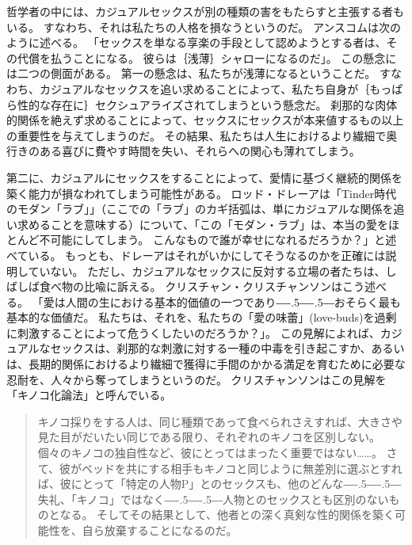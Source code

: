 \documentclass[paper=a4,book,openany]{jlreq}
\def\DDASH{―\kern-.5\zw―\kern-.5\zw―} %
\begin{document}
哲学者の中には、カジュアルセックスが別の種類の害をもたらすと主張する者もいる。
すなわち、それは私たちの人格を損なうというのだ。
アンスコムは次のように述べる。
「セックスを単なる享楽の手段として認めようとする者は、その代償を払うことになる。
彼らは｛浅薄｝{シャロー}になるのだ」\citep{anscombe72contraception}。
この懸念には二つの側面がある。
第一の懸念は、私たちが浅薄になるということだ。
すなわち、カジュアルなセックスを追い求めることによって、私たち自身が｛もっぱら性的な存在に｝{セクシュアライズ}されてしまうという懸念だ。
刹那的な肉体的関係を絶えず求めることによって、セックスにセックスが本来値するもの以上の重要性を与えてしまうのだ。
その結果、私たちは人生におけるより繊細で奥行きのある喜びに費やす時間を失い、それらへの関心も薄れてしまう。

第二に、カジュアルにセックスをすることによって、愛情に基づく継続的関係を築く能力が損なわれてしまう可能性がある。
ロッド・ドレーアは「Tinder時代のモダン「ラブ」」（ここでの「ラブ」のカギ括弧は、単にカジュアルな関係を追い求めることを意味する）について、「この「モダン・ラブ」は、本当の愛をほとんど不可能にしてしまう。
こんなもので誰が幸せになれるだろうか？」と述べている\citep{dreher15:_moder_love_age_tind}。
もっとも、ドレーアはそれがいかにしてそうなるのかを正確には説明していない。
ただし、カジュアルなセックスに反対する立場の者たちは、しばしば食べ物の比喩に訴える。
クリスチャン・クリスチャンソンはこう述べる。
「愛は人間の生における基本的価値の一つであり{\DDASH}おそらく最も基本的な価値だ。
私たちは、それを、私たちの「愛の味蕾」(love-buds)を過剰に刺激することによって危うくしたいのだろうか？」\citep[p.105]{krisjansson98:_casual_sex_revis}。
この見解によれば、カジュアルなセックスは、刹那的な刺激に対する一種の中毒を引き起こすか、あるいは、長期的関係におけるより繊細で獲得に手間のかかる満足を育むために必要な忍耐を、人々から奪ってしまうというのだ。
クリスチャンソンはこの見解を「キノコ化論法」と呼んでいる。

\begin{quote}
  キノコ採りをする人は、同じ種類であって食べられさえすれば、大きさや見た目がだいたい同じである限り、それぞれのキノコを区別しない。
個々のキノコの独自性など、彼にとってはまったく重要ではない……。
さて、彼がベッドを共にする相手もキノコと同じように無差別に選ぶとすれば、彼にとって「特定の人物P」とのセックスも、他のどんな{\DDASH}失礼、「キノコ」ではなく{\DDASH}人物とのセックスとも区別のないものとなる。
そしてその結果として、他者との深く真剣な性的関係を築く可能性を、自ら放棄することになるのだ。
\citep[p.101]{krisjansson98:_casual_sex_revis}
\end{quote}
\end{document}
